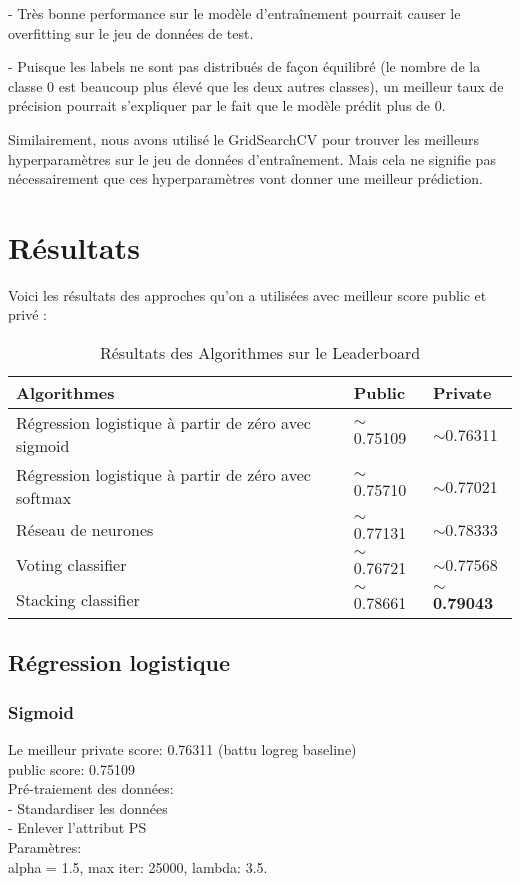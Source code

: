 \documentclass{article}
\begin{document}
- Très bonne performance sur le modèle d'entraînement pourrait causer le 
overfitting sur le jeu de données de test.

- Puisque les labels ne sont pas distribués de façon équilibré (le nombre de la
classe 0 est beaucoup plus élevé que les deux autres classes), un meilleur taux 
de précision pourrait s'expliquer par le fait que le modèle prédit plus de 0.

Similairement, nous avons utilisé le GridSearchCV pour trouver les meilleurs 
hyperparamètres sur le jeu de données d'entraînement. Mais cela ne signifie pas 
nécessairement que ces hyperparamètres vont donner une meilleur prédiction. 


\section{Résultats}
Voici les résultats des approches qu'on a utilisées avec meilleur score public 
et privé :

\begin{table}[!htbp]
  \caption{Résultats des Algorithmes sur le Leaderboard}
  \label{results-table}
  \centering
  \begin{tabular}{lll}
    \toprule
    Algorithmes     & Public     & Private \\
    \midrule
    Régression logistique à partir de zéro avec sigmoid & $\sim$0.75109  & $\sim$0.76311     \\
    Régression logistique à partir de zéro avec softmax     & $\sim$0.75710 & $\sim$0.77021      \\
    Réseau de neurones     & $\sim$0.77131       & $\sim$0.78333  \\
    Voting classifier     & $\sim$0.76721       & $\sim$0.77568  \\
    Stacking classifier     & $\sim$0.78661       & \textbf{$\sim$0.79043} \\
    \bottomrule
  \end{tabular}
\end{table}

\subsection{Régression logistique}
\subsubsection{Sigmoid}
\noindent
Le meilleur private score: 0.76311 (battu logreg baseline) \\
public score: 0.75109 \\
Pré-traiement des données: \\
- Standardiser les données \\
- Enlever l'attribut PS \\
Paramètres: \\
alpha = 1.5, max iter: 25000, lambda: 3.5. \\
\end{document}
